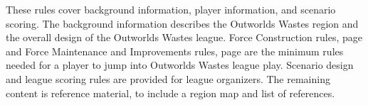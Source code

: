 These rules cover background information, player information, and scenario scoring.
The background information describes the Outworlds Wastes region and the overall design of the Outworlds Wastes league.
Force Construction rules, page \pageref{subsec:force_construction} and Force Maintenance and Improvements rules, page \pageref{subsec:force_maintenance} are the minimum rules needed for a player to jump into Outworlds Wastes league play.
Scenario design and league scoring rules are provided for league organizers.
The remaining content is reference material, to include a region map and list of references.
